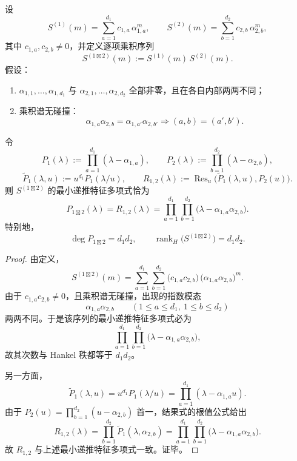 \begin{theorem}[两因子张量化递推的精确结果式闭包]\label{thm:pom-twofactor-tensor-recurrence-exact-resultant-closure}
设
\[
S^{(1)}(m)=\sum_{a=1}^{d_1} c_{1,a}\,\alpha_{1,a}^{m},
\qquad
S^{(2)}(m)=\sum_{b=1}^{d_2} c_{2,b}\,\alpha_{2,b}^{m},
\]
其中 \(c_{1,a},c_{2,b}\neq 0\)，并定义逐项乘积序列
\[
S^{(1\boxtimes 2)}(m):=S^{(1)}(m)\,S^{(2)}(m).
\]
假设：
\begin{enumerate}
  \item \(\alpha_{1,1},\dots,\alpha_{1,d_1}\) 与 \(\alpha_{2,1},\dots,\alpha_{2,d_2}\) 全部非零，且在各自内部两两不同；
  \item 乘积谱无碰撞：
  \[
  \alpha_{1,a}\alpha_{2,b}=\alpha_{1,a'}\alpha_{2,b'}
  \Longrightarrow
  (a,b)=(a',b').
  \]
\end{enumerate}
令
\[
P_1(\lambda):=\prod_{a=1}^{d_1}(\lambda-\alpha_{1,a}),
\qquad
P_2(\lambda):=\prod_{b=1}^{d_2}(\lambda-\alpha_{2,b}),
\]
\[
\widetilde P_1(\lambda,u):=u^{d_1}P_1(\lambda/u),
\qquad
R_{1,2}(\lambda):=\operatorname{Res}_{u}\!\bigl(\widetilde P_1(\lambda,u),P_2(u)\bigr).
\]
则 \(S^{(1\boxtimes 2)}\) 的最小递推特征多项式恰为
\[
P_{1\boxtimes 2}(\lambda)=R_{1,2}(\lambda)
=
\prod_{a=1}^{d_1}\prod_{b=1}^{d_2}\bigl(\lambda-\alpha_{1,a}\alpha_{2,b}\bigr).
\]
特别地，
\[
\deg P_{1\boxtimes 2}=d_1d_2,
\qquad
\operatorname{rank}_H\!\bigl(S^{(1\boxtimes 2)}\bigr)=d_1d_2.
\]
\end{theorem}
\begin{proof}
由定义，
\[
S^{(1\boxtimes 2)}(m)
=
\sum_{a=1}^{d_1}\sum_{b=1}^{d_2}
\bigl(c_{1,a}c_{2,b}\bigr)\,
\bigl(\alpha_{1,a}\alpha_{2,b}\bigr)^m.
\]
由于 \(c_{1,a}c_{2,b}\neq 0\)，且乘积谱无碰撞，出现的指数模态
\[
\alpha_{1,a}\alpha_{2,b}
\qquad
(1\le a\le d_1,\ 1\le b\le d_2)
\]
两两不同。于是该序列的最小递推特征多项式必为
\[
\prod_{a=1}^{d_1}\prod_{b=1}^{d_2}
\bigl(\lambda-\alpha_{1,a}\alpha_{2,b}\bigr),
\]
故其次数与 Hankel 秩都等于 \(d_1d_2\)。

另一方面，
\[
\widetilde P_1(\lambda,u)
=
u^{d_1}P_1(\lambda/u)
=
\prod_{a=1}^{d_1}(\lambda-\alpha_{1,a}u).
\]
由于 \(P_2(u)=\prod_{b=1}^{d_2}(u-\alpha_{2,b})\) 首一，结果式的根值公式给出
\[
R_{1,2}(\lambda)
=
\prod_{b=1}^{d_2}\widetilde P_1(\lambda,\alpha_{2,b})
=
\prod_{a=1}^{d_1}\prod_{b=1}^{d_2}
\bigl(\lambda-\alpha_{1,a}\alpha_{2,b}\bigr).
\]
故 \(R_{1,2}\) 与上述最小递推特征多项式一致。证毕。
\end{proof}

